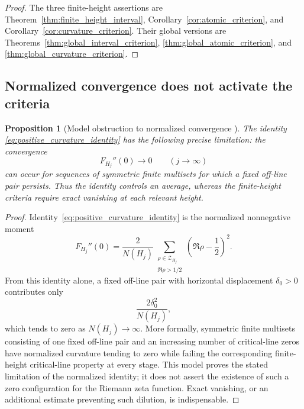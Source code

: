 \documentclass[11pt]{amsart}
\numberwithin{equation}{section}
\theoremstyle{plain}
\newtheorem{proposition}[theorem]{Proposition}
\theoremstyle{definition}
\theoremstyle{remark}
\begin{document}
\begin{proof}
The three finite-height assertions are Theorem~\ref{thm:finite_height_interval}, Corollary~\ref{cor:atomic_criterion}, and Corollary~\ref{cor:curvature_criterion}.  Their global versions are Theorems~\ref{thm:global_interval_criterion}, \ref{thm:global_atomic_criterion}, and \ref{thm:global_curvature_criterion}.
\end{proof}

\subsection{Normalized convergence does not activate the criteria}
\label{subsec:normalized_convergence_insufficient}

\begin{proposition}[Model obstruction to normalized convergence {\normalfont[Unconditional]}]
\label{prop:normalized_convergence_insufficient}
The identity \eqref{eq:positive_curvature_identity} has the following precise limitation: the convergence
\begin{equation}
F_{H_j}''(0)\longrightarrow0
\qquad(j\longrightarrow\infty)
\label{eq:normalized_curvature_convergence}
\end{equation}
can occur for sequences of symmetric finite multisets for which a fixed off-line pair persists.  Thus the identity controls an average, whereas the finite-height criteria require exact vanishing at each relevant height.
\end{proposition}

\begin{proof}
Identity~\eqref{eq:positive_curvature_identity} is the normalized nonnegative moment
\begin{equation}
F_{H_j}''(0)
=
\frac{2}{N(H_j)}
\sum_{\substack{\rho\in\mathcal Z_{H_j}\\\Re\rho>1/2}}
\left(\Re\rho-\frac12\right)^2.
\label{eq:normalized_curvature_average}
\end{equation}
From this identity alone, a fixed off-line pair with horizontal displacement $\delta_0>0$ contributes only
\begin{equation}
\frac{2\delta_0^2}{N(H_j)},
\label{eq:fixed_offline_pair_dilution}
\end{equation}
which tends to zero as $N(H_j)\to\infty$.  More formally, symmetric finite multisets consisting of one fixed off-line pair and an increasing number of critical-line zeros have normalized curvature tending to zero while failing the corresponding finite-height critical-line property at every stage.  This model proves the stated limitation of the normalized identity; it does not assert the existence of such a zero configuration for the Riemann zeta function.  Exact vanishing, or an additional estimate preventing such dilution, is indispensable.
\end{proof}
\end{document}
